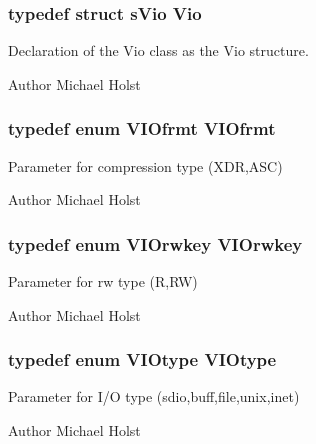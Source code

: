 \subsubsection[{Vio}]{\setlength{\rightskip}{0pt plus 5cm}typedef struct {\bf s\-Vio} {\bf Vio}}\label{a00028_ga277550356f3dd78c988516b1e172a9c6}


Declaration of the Vio class as the Vio structure. 

\begin{DoxyAuthor}{Author}
Michael Holst 
\end{DoxyAuthor}
\subsubsection[{V\-I\-Ofrmt}]{\setlength{\rightskip}{0pt plus 5cm}typedef enum {\bf V\-I\-Ofrmt}  {\bf V\-I\-Ofrmt}}\label{a00028_ga163ab2afe12d8f6739822eac4933da1d}


Parameter for compression type (X\-D\-R,A\-S\-C) 

\begin{DoxyAuthor}{Author}
Michael Holst 
\end{DoxyAuthor}
\subsubsection[{V\-I\-Orwkey}]{\setlength{\rightskip}{0pt plus 5cm}typedef enum {\bf V\-I\-Orwkey}  {\bf V\-I\-Orwkey}}\label{a00028_ga657e164038235f4739ea0ee41b9e368d}


Parameter for rw type (R,R\-W) 

\begin{DoxyAuthor}{Author}
Michael Holst 
\end{DoxyAuthor}
\subsubsection[{V\-I\-Otype}]{\setlength{\rightskip}{0pt plus 5cm}typedef enum {\bf V\-I\-Otype}  {\bf V\-I\-Otype}}\label{a00028_gaf946e6d7d3ed8f5bdb3de70792477fa4}


Parameter for I/\-O type (sdio,buff,file,unix,inet) 

\begin{DoxyAuthor}{Author}
Michael Holst 
\end{DoxyAuthor}


